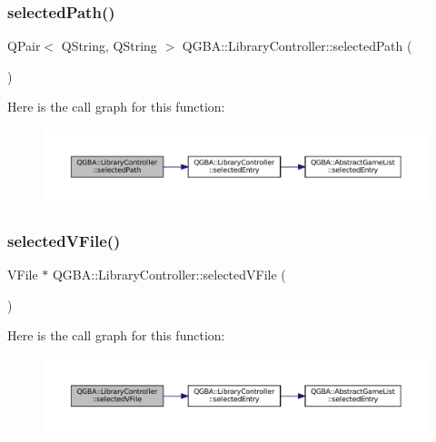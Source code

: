\subsubsection{\texorpdfstring{selected\+Path()}{selectedPath()}}
{\footnotesize\ttfamily Q\+Pair$<$ Q\+String, Q\+String $>$ Q\+G\+B\+A\+::\+Library\+Controller\+::selected\+Path (\begin{DoxyParamCaption}{ }\end{DoxyParamCaption})}

Here is the call graph for this function\+:
\nopagebreak
\begin{figure}[H]
\begin{center}
\leavevmode
\includegraphics[width=350pt]{class_q_g_b_a_1_1_library_controller_a3ab757f52f47c97e0e9b753d51e7a7bd_cgraph}
\end{center}
\end{figure}
\mbox{\label{class_q_g_b_a_1_1_library_controller_a5f99551f35fe696c168ab9a60f390874}} 
\subsubsection{\texorpdfstring{selected\+V\+File()}{selectedVFile()}}
{\footnotesize\ttfamily V\+File $\ast$ Q\+G\+B\+A\+::\+Library\+Controller\+::selected\+V\+File (\begin{DoxyParamCaption}{ }\end{DoxyParamCaption})}

Here is the call graph for this function\+:
\nopagebreak
\begin{figure}[H]
\begin{center}
\leavevmode
\includegraphics[width=350pt]{class_q_g_b_a_1_1_library_controller_a5f99551f35fe696c168ab9a60f390874_cgraph}
\end{center}
\end{figure}
\mbox{\label{class_q_g_b_a_1_1_library_controller_ac226d6690f902db907fbd66c80c45582}} 
